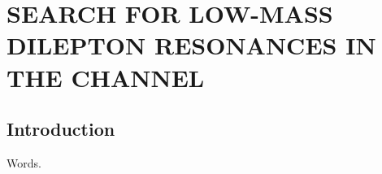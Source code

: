 \chapter{SEARCH FOR LOW-MASS DILEPTON RESONANCES IN THE \texorpdfstring{\hzxxxfourl}{H to ZX/XX to 4l} CHANNEL}
\label{ch:dilep_res}
\section{Introduction}
Words.
